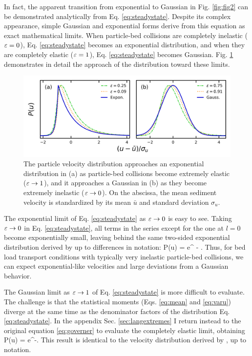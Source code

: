 In fact, the apparent transition from exponential to Gaussian in Fig. \ref{fig:fig2} can be demonstrated analytically from Eq. \ref{eq:steadystate}. Despite its complex appearance, simple Gaussian and exponential forms derive from this equation as exact mathematical limits.
When particle-bed collisions are completely inelastic ($\varepsilon = 0$), Eq. \ref{eq:steadystate} becomes an exponential distribution, and when they are completely elastic ($\varepsilon = 1$), Eq. \ref{eq:steadystate} becomes Gaussian.
Fig. \ref{fig:fig3} demonstrates in detail the approach of the distribution toward these limits.
\begin{figure}
	\centerline{\includegraphics{./figures/ch5/Fig3asymptotic.png}}
	\caption{The particle velocity distribution approaches an exponential distribution in (a) as particle-bed collisions become extremely elastic ($\varepsilon \rightarrow 1$), and it approaches a Gaussian in (b) as they become extremely inelastic ($\varepsilon \rightarrow 0$). On the abscissa, the mean sediment velocity is standardized by its mean $\bar{u}$ and standard deviation $\sigma_u$. }
	\label{fig:fig3}
\end{figure}

The exponential limit of Eq. \ref{eq:steadystate} as $\varepsilon \rightarrow 0$ is easy to see. Taking $\varepsilon \rightarrow 0 $ in Eq. \ref{eq:steadystate}, all terms in the series except for the one at $l=0$ become exponentially small, leaving behind the same two-sided exponential distribution derived by \cite{Fan2014} up to differences in notation:
\be P(u) = e^{ - }. \ee
Thus, for bed load transport conditions with typically very inelastic particle-bed collisions, we can expect exponential-like velocities and large deviations from a Gaussian behavior.

The Gaussian limit as $\varepsilon \rightarrow 1$ of Eq. \ref{eq:steadystate} is more difficult to evaluate. The challenge is that the statistical moments (Eqs. \ref{eq:mean} and \ref{eq:varu}) diverge at the same time as the denominator factors of the distribution Eq. \ref{eq:steadystate}. In the appendix Sec. \ref{sec:langextremes} I return instead to the original equation \ref{eq:governer} to evaluate the completely elastic limit, obtaining
\be P(u) = e^{-}. \label{eq:gaussian}\ee
This result is identical to the velocity distribution derived by \citet{Ancey2014}, up to notation.

